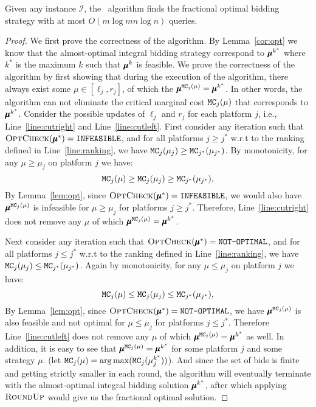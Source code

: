 \begin{theorem}\label{thm:medianofmedians}
Given any instance $\mathcal{I}$, the \mom\ algorithm finds the fractional optimal bidding strategy with at most $O(m \log mn \log n)$ queries.
\end{theorem}
\begin{proof}
We first prove the correctness of the algorithm. By Lemma~\ref{cor:opt} we know that the almost-optimal integral bidding strategy correspond to $\pmb{\mu}^{k^*}$ where $k^*$ is the maximum $k$ such that $\pmb{\mu}^k$ is feasible. 
We prove the correctness of the algorithm by first showing that during the execution of the algorithm, there always exist some $\mu \in [\ell_j, r_j]$, of which the $\pmb{\mu}^{\texttt{MC}_j(\mu)} = \pmb{\mu}^{k^*}$. 
In other words, the algorithm can not eliminate the critical marginal cost $\texttt{MC}_j(\mu)$ that corresponds to $\pmb{\mu}^{k^*}$.
Consider the possible updates of $\ell_j$ and $r_j$ for each platform $j$, i.e., Line~\ref{line:cutright} and Line~\ref{line:cutleft}. 
First consider any iteration such that $\textsc{OptCheck}(\pmb{\mu}^*) = \texttt{INFEASIBLE}$, and for all platforms $j \geq j^*$ w.r.t to the ranking defined in Line~\ref{line:ranking}, we have $\texttt{MC}_j(\mu_j) \geq \texttt{MC}_{j^*}(\mu_{j^*})$. 
By monotonicity, for any $\mu \geq \mu_j$ on platform $j$ we have:
\[\texttt{MC}_j(\mu) \geq \texttt{MC}_j(\mu_j) \geq \texttt{MC}_{j^*}(\mu_{j^*}),\]
By Lemma~\ref{lem:opt}, since $\textsc{OptCheck}(\pmb{\mu}^*) = \texttt{INFEASIBLE}$, we would also have $\pmb{\mu}^{\texttt{MC}_j(\mu)}$ is infeasible for $\mu \geq \mu_j$ for platforms $j \geq j^*$. 
Therefore, Line~\ref{line:cutright} does not remove any $\mu$ of which $\pmb{\mu}^{\texttt{MC}_j(\mu)} = \pmb{\mu}^{k^*}$.

Next consider any iteration such that $\textsc{OptCheck}(\pmb{\mu}^*) = \texttt{NOT-OPTIMAL}$, and for all platforms $j \leq j^*$ w.r.t to the ranking defined in Line~\ref{line:ranking}, we have $\texttt{MC}_j(\mu_j) \leq \texttt{MC}_{j^*}(\mu_{j^*})$. Again by monotonicity, for any $\mu \leq \mu_j$ on platform $j$ we have:
\[\texttt{MC}_j(\mu) \leq \texttt{MC}_j(\mu_j) \leq \texttt{MC}_{j^*}(\mu_{j^*}),\]
By Lemma~\ref{lem:opt}, since $\textsc{OptCheck}(\pmb{\mu}^*) = \texttt{NOT-OPTIMAL}$, we have $\pmb{\mu}^{\texttt{MC}_j(\mu)}$ is also feasible and not optimal for $\mu \leq \mu_j$ for platforms $j \leq j^*$. Therefore Line~\ref{line:cutleft} does not remove any $\mu$ of which $\pmb{\mu}^{\texttt{MC}_j(\mu)} = \pmb{\mu}^{k^*}$ as well. 
In addition, it is easy to see that $\pmb{\mu}^{\texttt{MC}_j(\mu)} = \pmb{\mu}^{k^*}$ for some platform $j$ and some strategy $\mu$. (let $\texttt{MC}_j(\mu) = \operatorname*{arg\,max} (\texttt{MC}_j(\mu^{k^*}_j))$). And since the set of bids is finite and getting strictly smaller in each round, the algorithm will eventually terminate with the almost-optimal integral bidding solution $\pmb{\mu}^{k^*}$, after which applying $\textsc{RoundUp}$ would give us the fractional optimal solution.


\end{proof}
